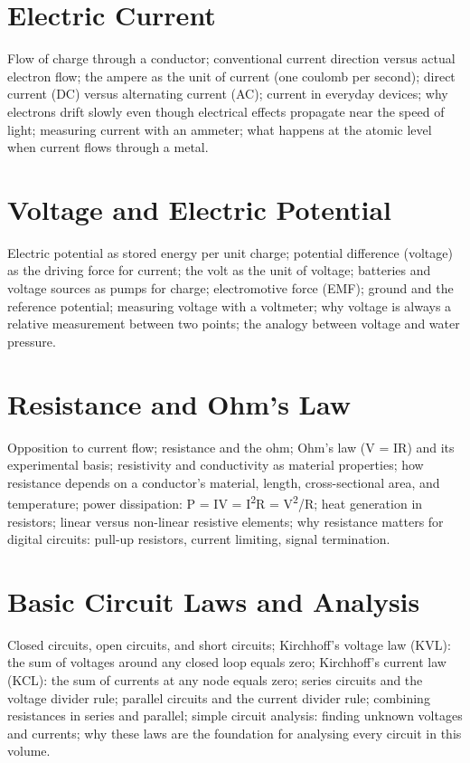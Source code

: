 \chapter{Electric Current}
\label{ch:electric-current}

Flow of charge through a conductor; conventional current direction versus
actual electron flow; the ampere as the unit of current (one coulomb per
second); direct current (DC) versus alternating current (AC); current in
everyday devices; why electrons drift slowly even though electrical effects
propagate near the speed of light; measuring current with an ammeter;
what happens at the atomic level when current flows through a metal.

\chapter{Voltage and Electric Potential}
\label{ch:voltage}

Electric potential as stored energy per unit charge; potential difference
(voltage) as the driving force for current; the volt as the unit of voltage;
batteries and voltage sources as pumps for charge; electromotive force (EMF);
ground and the reference potential; measuring voltage with a voltmeter;
why voltage is always a relative measurement between two points; the
analogy between voltage and water pressure.

\chapter{Resistance and Ohm's Law}
\label{ch:resistance-ohms-law}

Opposition to current flow; resistance and the ohm; Ohm's law (V = IR) and
its experimental basis; resistivity and conductivity as material properties;
how resistance depends on a conductor's material, length, cross-sectional
area, and temperature; power dissipation: P = IV = I\textsuperscript{2}R =
V\textsuperscript{2}/R; heat generation in resistors; linear versus
non-linear resistive elements; why resistance matters for digital circuits:
pull-up resistors, current limiting, signal termination.

\chapter{Basic Circuit Laws and Analysis}
\label{ch:circuit-laws}

Closed circuits, open circuits, and short circuits; Kirchhoff's voltage law
(KVL): the sum of voltages around any closed loop equals zero; Kirchhoff's
current law (KCL): the sum of currents at any node equals zero; series
circuits and the voltage divider rule; parallel circuits and the current
divider rule; combining resistances in series and parallel; simple circuit
analysis: finding unknown voltages and currents; why these laws are the
foundation for analysing every circuit in this volume.

